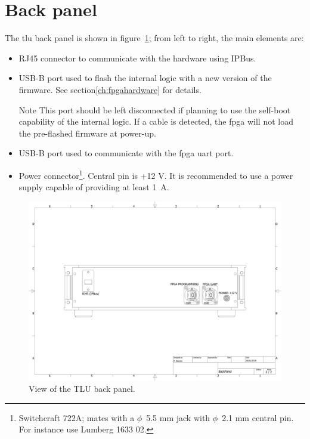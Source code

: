 \section{Back panel}\label{ch:backpanelintro}
The \gls{tlu} back panel is shown in figure~\ref{fig:backpanel}; from left to right, the main elements are:
\begin{itemize}
  \item RJ45 connector to communicate with the hardware using IPBus.
  \item USB-B port used to flash the internal logic with a new version of the firmware. See section\ref{ch:fpgahardware} for details.
  \begin{alertinfo}{Note}
    This port should be left disconnected if planning to use the self-boot capability of the internal logic. If a cable is detected, the \gls{fpga} will not load the pre-flashed firmware at power-up.
  \end{alertinfo}
  \item USB-B port used to communicate with the \gls{fpga} \gls{uart} port.
  \item Power connector\footnote{Switchcraft 722A; mates with a $\phi$~5.5 mm jack with $\phi$~2.1 mm central pin. For instance use Lumberg 1633 02.}. Central pin is +12 V. It is recommended to use a power supply capable of providing at least 1~A.
\end{itemize}
\begin{figure}
  \centering
  \includegraphics[width=.950\textwidth]{./Images/backPaneldoc.pdf}
  \caption{View of the TLU back panel.}
  \label{fig:backpanel}
\end{figure}

